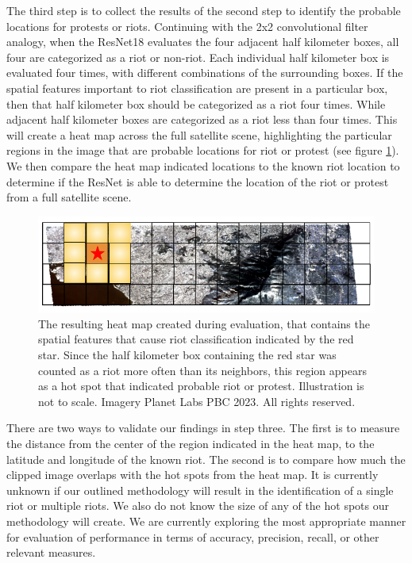 The third step is to collect the results of the second step to identify the probable locations for protests or riots.  Continuing with the 2x2 convolutional filter analogy, when the ResNet18 evaluates the four adjacent half kilometer boxes, all four are categorized as a riot or non-riot.  Each individual half kilometer box is evaluated four times, with different combinations of the surrounding boxes.  If the spatial features important to riot classification are present in a particular box, then that half kilometer box should be categorized as a riot four times.  While adjacent half kilometer boxes are categorized as a riot less than four times.  This will create a heat map across the full satellite scene, highlighting the particular regions in the image that are probable locations for riot or protest (see figure \ref{fig:heatmap_paper3}).  We then compare the heat map indicated locations to the known riot location to determine if the ResNet is able to determine the location of the riot or protest from a full satellite scene.

\begin{figure}
    \centering
    \includegraphics[width=0.75\linewidth]{Figures/heatmap_localized.png}
    \caption{The resulting heat map created during evaluation, that contains the spatial features that cause riot classification indicated by the red star.  Since the half kilometer box containing the red star was counted as a riot more often than its neighbors, this region appears as a hot spot that indicated probable riot or protest.  Illustration is not to scale.  Imagery \textcopyright Planet Labs PBC 2023. All rights reserved.}
    \label{fig:heatmap_paper3}
\end{figure}
There are two ways to validate our findings in step three.  The first is to measure the distance from the center of the region indicated in the heat map, to the latitude and longitude of the known riot.  The second is to compare how much the clipped image overlaps with the hot spots from the heat map.  It is currently unknown if our outlined methodology will result in the identification of a single riot or multiple riots.  We also do not know the size of any of the hot spots our methodology will create.  We are currently exploring the most appropriate manner for evaluation of performance in terms of accuracy, precision, recall, or other relevant measures.

